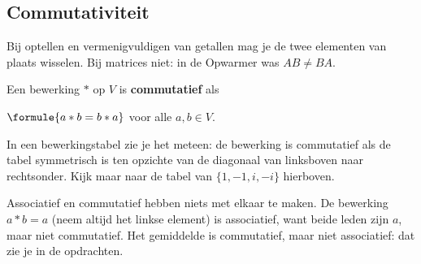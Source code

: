 \begin{oefeningen}
\end{oefeningen}

\subsection{Commutativiteit}

Bij optellen en vermenigvuldigen van getallen mag je de twee elementen van plaats wisselen. Bij matrices niet: in de Opwarmer was $AB \neq BA$.

\begin{theorie}
Een bewerking $\ast$ op $V$ is \textbf{\textcolor{accent}{commutatief}} als

\vspace{1mm}
\qquad $\formule{a \ast b = b \ast a}$ \qquad voor alle $a, b \in V$.
\end{theorie}

In een bewerkingstabel zie je het meteen: de bewerking is commutatief als de tabel symmetrisch is ten opzichte van de diagonaal van linksboven naar rechtsonder. Kijk maar naar de tabel van $\{1, -1, i, -i\}$ hierboven.

Associatief en commutatief hebben niets met elkaar te maken. De bewerking $a \ast b = a$ (neem altijd het linkse element) is associatief, want beide leden zijn $a$, maar niet commutatief. Het gemiddelde is commutatief, maar niet associatief: dat zie je in de opdrachten.


\begin{oefeningen}
\end{oefeningen}

